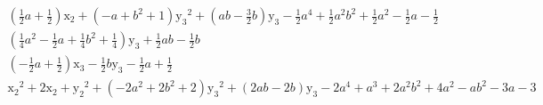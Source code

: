\begin{multline*}
\left(\frac{1}{2} a + \frac{1}{2}\right) \mathrm{x_2} + \left(-a + b^{2} + 1\right) \mathrm{y_3}^{2} + \left(a b - \frac{3}{2} b\right) \mathrm{y_3} - \frac{1}{2} a^{4} + \frac{1}{2} a^{2} b^{2} + \frac{1}{2} a^{2} - \frac{1}{2} a - \frac{1}{2} \\
\left(\frac{1}{4} a^{2} - \frac{1}{2} a + \frac{1}{4} b^{2} + \frac{1}{4}\right) \mathrm{y_3} + \frac{1}{2} a b - \frac{1}{2} b \\
\left(-\frac{1}{2} a + \frac{1}{2}\right) \mathrm{x_3} - \frac{1}{2} b \mathrm{y_3} - \frac{1}{2} a + \frac{1}{2} \\
\mathrm{x_2}^{2} + 2 \mathrm{x_2} + \mathrm{y_2}^{2} + \left(-2 a^{2} + 2 b^{2} + 2\right) \mathrm{y_3}^{2} + \left(2 a b - 2 b\right) \mathrm{y_3} - 2 a^{4} + a^{3} + 2 a^{2} b^{2} + 4 a^{2} - a b^{2} - 3 a - 3\\
  \end{multline*}
